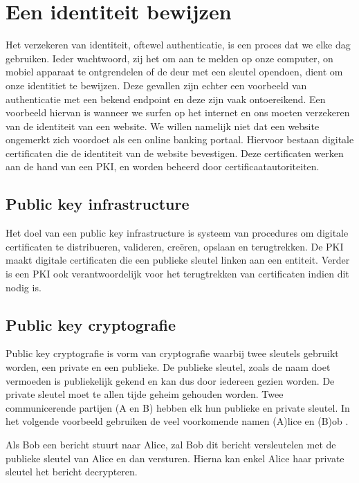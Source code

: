 \chapter{Een identiteit bewijzen}
\label{ch:identiteit-bewijzen}

Het verzekeren van identiteit, oftewel authenticatie, is een proces dat we elke
dag gebruiken. Ieder wachtwoord, zij het om aan te melden op onze computer,
on mobiel apparaat te ontgrendelen of de deur met een sleutel opendoen, dient om onze identitiet te bewijzen. Deze gevallen zijn echter
een voorbeeld van authenticatie met een bekend endpoint en deze zijn vaak
ontoereikend. Een voorbeeld hiervan is wanneer we surfen op het internet en ons
moeten verzekeren van de identiteit van een website. We willen namelijk niet dat
een website ongemerkt zich voordoet als een online banking portaal. Hiervoor
bestaan digitale certificaten die de identiteit van de website bevestigen. Deze
certificaten werken aan de hand van een \gls{PKI},
en worden beheerd door certificaatautoriteiten.

\section{Public key infrastructure}
\label{sec:public-key-infrastructure}

Het doel van een public key infrastructure is systeem van procedures om digitale
certificaten te distribueren, valideren, creëren, opslaan en terugtrekken. De
\gls{PKI} maakt digitale certificaten die een publieke sleutel linken aan een
entiteit. Verder is een \gls{PKI} ook verantwoordelijk voor het terugtrekken van
certificaten indien dit nodig is.

\section{Public key cryptografie}
\label{sec:public-key-cryptografie}

Public key cryptografie is vorm van cryptografie waarbij twee sleutels gebruikt
worden, een private en een publieke. De publieke sleutel, zoals de naam doet
vermoeden is publiekelijk gekend en kan dus door iedereen gezien worden. De
private sleutel moet te allen tijde geheim gehouden worden. Twee communicerende
partijen (A en B) hebben elk hun publieke en private sleutel. In het volgende
voorbeeld gebruiken de veel voorkomende namen (A)lice en (B)ob
\autocite{Rivest1978}.

Als Bob een bericht stuurt naar Alice, zal Bob dit bericht versleutelen met de
publieke sleutel van Alice en dan versturen. Hierna kan enkel Alice haar private
sleutel het bericht decrypteren.

